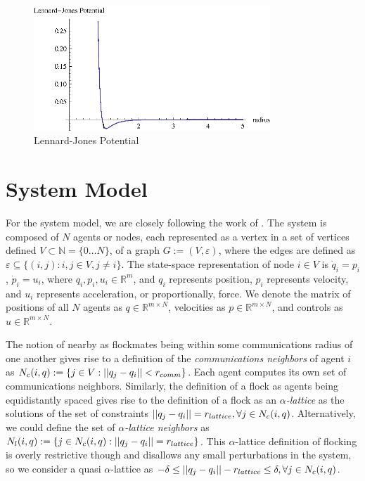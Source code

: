 \documentclass[10pt, conference, compsocconf]{IEEEtran}
\begin{document}
\begin{figure}[!b]
  \begin{center}
    \includegraphics[width=3.5in]{lennardJonesPotential}
  \end{center}

  \caption{\small Lennard-Jones Potential}
  \label{fig:lennardJonesPotential}
\end{figure}

\section{System Model}
\label{sec:model}
For the system model, we are closely following the work of \cite{os2006}.
%
The system is composed of $N$ agents or nodes, each represented as a vertex in a set of vertices defined $V \subset \mathbb{N} = \{0 \ldots N \}$, of a graph $G := (V, \varepsilon)$, where the edges are defined as $\varepsilon \subseteq \{(i,j) : i,j \in V, j \neq i\}$.
%
The state-space representation of node $i \in V$ is $\dot{q}_i = p_i$, $\dot{p}_i = u_i$, where $q_i, p_i, u_i \in \mathbb{R}^m$, and $q_i$ represents position, $p_i$ represents velocity, and $u_i$ represents acceleration, or proportionally, force.
%
We denote the matrix of positions of all $N$ agents as $q \in \mathbb{R}^{m \times N}$, velocities as $p \in \mathbb{R}^{m \times N}$, and controls as $u \in \mathbb{R}^{m \times N}$.

The notion of nearby as flockmates being within some communications radius of one another gives rise to a definition of the \textit{communications neighbors} of agent $i$ as $N_c(i, q) := \{ j \in V : \lvert\lvert q_j - q_i\rvert\rvert < r_{comm}\}$.
%
Each agent computes its own set of communications neighbors.
%
Similarly, the definition of a flock as agents being equidistantly spaced gives rise to the definition of a flock as an \textit{$\alpha$-lattice} as the solutions of the set of constraints $\lvert\lvert q_j - q_i\rvert\rvert = r_{lattice}, \forall j \in N_c(i, q)$.
%
Alternatively, we could define the set of \textit{$\alpha$-lattice neighbors} as $N_l(i, q) := \{ j \in N_c(i, q) :  \lvert\lvert q_j - q_i\rvert\rvert = r_{lattice}\}$.
%
This $\alpha$-lattice definition of flocking is overly restrictive though and disallows any small perturbations in the system, so we consider a quasi $\alpha$-lattice as $-\delta \leq \lvert\lvert q_j - q_i\rvert\rvert - r_{lattice} \leq \delta, \forall j \in N_c(i, q)$.
\end{document}
